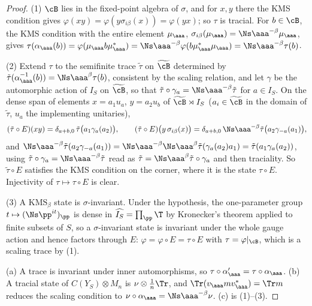 \begin{proof}
(1) $\cB$ lies in the fixed-point algebra of $\sigma$, and for $x,y$ there the KMS condition
gives $\varphi(xy)=\varphi(y\sigma_{i\beta}(x))=\varphi(yx)$; so $\tau$ is tracial. For
$b\in\cB$, the KMS condition with the entire element $\mu_\aaa$,
$\sigma_{i\beta}(\mu_\aaa)=\Ns\aaa^{-\beta}\mu_\aaa$, gives
$\tau(\alpha_\aaa(b))=\varphi(\mu_\aaa b\mu_\aaa^*)=\Ns\aaa^{-\beta}\varphi(b\mu_\aaa^*\mu_\aaa)=\Ns\aaa^{-\beta}\tau(b)$.

(2) Extend $\tau$ to the semifinite trace $\tilde\tau$ on $\widetilde\cB$ determined by
$\tilde\tau(\alpha_\aaa^{-1}(b))=\Ns\aaa^{\beta}\tau(b)$, consistent by the scaling relation,
and let $\gamma$ be the automorphic action of $I_S$ on $\widetilde\cB$, so that
$\tilde\tau\circ\gamma_a=\Ns\aaa^{-\beta}\tilde\tau$ for $a\in I_S$. On the dense span of
elements $x=a_1u_a$, $y=a_2u_b$ of $\widetilde\cB\rtimes I_S$ ($a_i\in\widetilde\cB$ in the
domain of $\tilde\tau$, $u_a$ the implementing unitaries),
\[
(\tilde\tau\circ E)(xy)=\delta_{a+b,0}\,\tilde\tau\bigl(a_1\gamma_a(a_2)\bigr),\qquad
(\tilde\tau\circ E)\bigl(y\,\sigma_{i\beta}(x)\bigr)=\delta_{a+b,0}\,\Ns\aaa^{-\beta}\tilde\tau\bigl(a_2\gamma_{-a}(a_1)\bigr),
\]
and $\Ns\aaa^{-\beta}\tilde\tau(a_2\gamma_{-a}(a_1))=\Ns\aaa^{-\beta}\Ns\aaa^{\beta}\tilde\tau(\gamma_a(a_2)a_1)=\tilde\tau(a_1\gamma_a(a_2))$,
using $\tilde\tau\circ\gamma_{a}=\Ns\aaa^{-\beta}\tilde\tau$ read as $\tilde\tau=\Ns\aaa^{\beta}\tilde\tau\circ\gamma_a$
and then traciality. So $\tilde\tau\circ E$ satisfies the KMS condition on the corner,
where it is the state $\tau\circ E$. Injectivity of $\tau\mapsto\tau\circ E$ is clear.

(3) A $\mathrm{KMS}_\beta$ state is $\sigma$-invariant. Under the hypothesis, the one-parameter
group $t\mapsto(\Ns\pp^{it})_\pp$ is dense in $\widehat{I_S}=\prod_\pp\T$ by Kronecker's
theorem applied to finite subsets of $S$, so a $\sigma$-invariant state is invariant under
the whole gauge action and hence factors through $E$: $\varphi=\varphi\circ E=\tau\circ E$
with $\tau=\varphi|_\cB$, which is a scaling trace by (1).

(a) A trace is invariant under inner automorphisms, so $\tau\circ\alpha'_\aaa=\tau\circ\alpha_\aaa$.
(b) A tracial state of $C(Y_S)\otimes M_n$ is $\nu\otimes\frac1n\Tr$, and
$\Tr(v_\aaa m v_\aaa^*)=\Tr m$ reduces the scaling condition to $\nu\circ\alpha_\aaa=\Ns\aaa^{-\beta}\nu$.
(c) is (1)--(3).
\end{proof}


